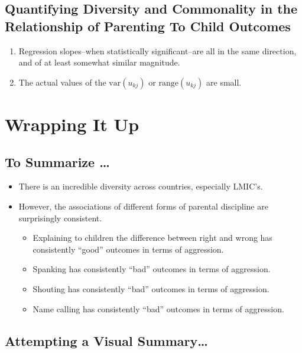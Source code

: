 \documentclass[
  letterpaper,
  DIV=11,
  numbers=noendperiod]{scrartcl}
\providecommand{\tightlist}{%
  \setlength{\itemsep}{0pt}\setlength{\parskip}{0pt}}
\begin{document}
\subsection{Quantifying Diversity and Commonality in the Relationship of
Parenting To Child
Outcomes}\label{quantifying-diversity-and-commonality-in-the-relationship-of-parenting-to-child-outcomes}

\begin{enumerate}
\def\labelenumi{\arabic{enumi}.}
\tightlist
\item
  {Regression slopes--when statistically significant--are all in the
  same direction}, and of at least somewhat similar magnitude.
\item
  The {actual values of the \(\text{var}(u_{kj})\) or
  \(\text{range}(u_{kj})\) are small}.
\end{enumerate}

\section{Wrapping It Up}\label{wrapping-it-up}

\subsection{To Summarize \ldots{}}\label{to-summarize}

\begin{itemize}
\tightlist
\item
  There is an {incredible diversity} across countries, especially
  LMIC's.
\item
  However, the {associations} of different forms of parental discipline
  are {surprisingly consistent}.

  \begin{itemize}
  \tightlist
  \item
    Explaining to children the difference between right and wrong has
    consistently {``good''} outcomes in terms of aggression.
  \item
    Spanking has consistently {``bad''} outcomes in terms of aggression.
  \item
    Shouting has consistently {``bad''} outcomes in terms of aggression.
  \item
    Name calling has consistently {``bad''} outcomes in terms of
    aggression.
  \end{itemize}
\end{itemize}

\subsection{Attempting a Visual
Summary\ldots{}}\label{attempting-a-visual-summary}
\end{document}
